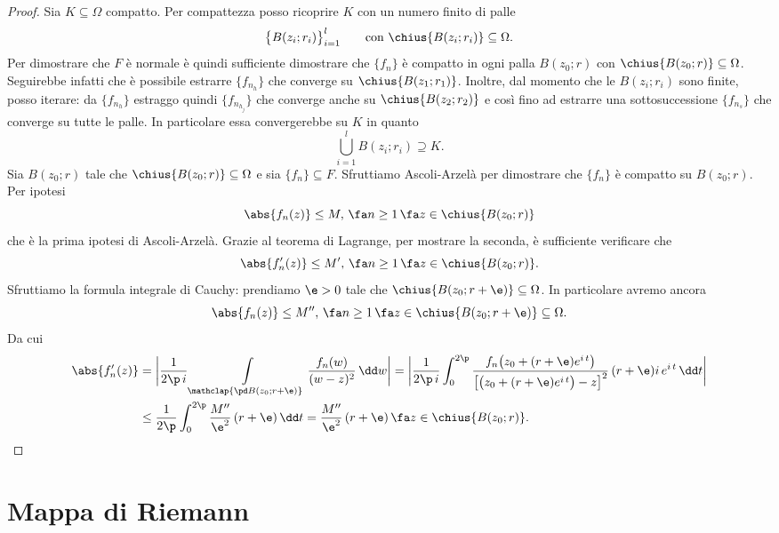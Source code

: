 \begin{proof}
	\graffito{\(\Leftarrow)\)}Sia \(K\subseteq \Omega\) compatto. Per compattezza posso ricoprire \(K\) con un numero finito di palle
	\[
		\big\{B(z_i;r_i)\big\}_{i=1}^l \qquad\text{con }\chius{B(z_i;r_i)} \subseteq \Omega.
	\]
	Per dimostrare che \(F\) è normale è quindi sufficiente dimostrare che \(\{f_n\}\) è compatto in ogni palla \(B(z_0;r)\) con \(\chius{B(z_0;r)}\subseteq\Omega\).
	Seguirebbe infatti che è possibile estrarre \(\{f_{n_h}\}\) che converge su \(\chius{B(z_1;r_1)}\). Inoltre, dal momento che le \(B(z_i;r_i)\) sono finite, posso iterare:
	da \(\{f_{n_h}\}\) estraggo quindi \(\{f_{n_{h_j}}\}\) che converge anche su \(\chius{B(z_2;r_2)}\) e così fino ad estrarre una sottosuccessione \(\{f_{n_s}\}\) che converge su tutte le palle. In particolare essa convergerebbe su \(K\) in quanto
	\[
		\bigcup_{i=1}^l B(z_i;r_i) \supseteq K.
	\]
	Sia \(B(z_0;r)\) tale che \(\chius{B(z_0;r)}\subseteq \Omega\) e sia \(\{f_n\}\subseteq F\).
	Sfruttiamo Ascoli-Arzelà per dimostrare che \(\{f_n\}\) è compatto su \(B(z_0;r)\).
	Per ipotesi
	\[
		\abs{f_n(z)} \le M,\,\fa n \ge 1\,\fa z\in \chius{B(z_0;r)}
	\]
	che è la prima ipotesi di Ascoli-Arzelà. Grazie al teorema di Lagrange, per mostrare la seconda, è sufficiente verificare che
	\[
		\abs{f_n'(z)} \le M',\,\fa n\ge 1\,\fa z\in \chius{B(z_0;r)}.
	\]
	Sfruttiamo la formula integrale di Cauchy:
	prendiamo \(\e>0\) tale che \(\chius{B(z_0;r+\e)}\subseteq \Omega\). In particolare avremo ancora
	\[
		\abs{f_n(z)} \le M'',\,\fa n\ge 1\,\fa z\in \chius{B(z_0;r+\e)}\subseteq \Omega.
	\]
	Da cui 
	\[
		\begin{split}
			\abs{f_n'(z)} & = \bigg\lvert \frac{1}{2\p\,i} \int\limits_{\mathclap{\pd B(z_0;r+\e)}} \frac{f_n(w)}{(w-z)^2}\,\dd w \bigg\rvert = \bigg\lvert \frac{1}{2\p\,i} \int_0^{2\p} \frac{f_n\big(z_0+(r+\e)e^{i\,t}\big)}{\big[\big(z_0+(r+\e)e^{i\,t}\big)-z\big]^2}\,(r+\e)i\,e^{i\,t}\,\dd t\bigg\rvert\\
			& \le \frac{1}{2\p} \int_0^{2\p} \frac{M''}{\e^2}\,(r+\e)\,\dd t = \frac{M''}{\e^2}\,(r+\e)\,\fa z\in \chius{B(z_0;r)}.\qedhere
		\end{split}
	\]
\end{proof}
%
%
\section{Mappa di Riemann}

